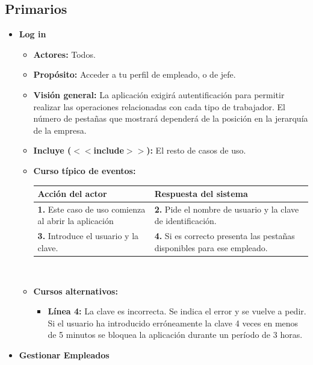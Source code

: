 \documentclass[spanish,a4paper,12pt]{report}		%
\begin{document}
\subsection{Primarios}		 		
	\begin{itemize} 	


	\item \textbf{Log in}		
			\begin{itemize}
			\item \textbf{Actores:} Todos.
			\item \textbf{Propósito:} Acceder a tu perfil de empleado, o de jefe.
			\item \textbf{Visión general:} La aplicación exigirá autentificación para permitir realizar las operaciones relacionadas con cada tipo de trabajador. El número de pestañas que mostrará dependerá de la posición en la jerarquía de la empresa. 
			\item \textbf{Incluye ($<<$include$>>$):} El resto de casos de uso.
			\item \textbf{Curso típico de eventos:} 	\\
				\begin{tabular}{|p{6cm}||p{6cm}|}
				\hline
				\textbf{Acción del actor} & \textbf{Respuesta del sistema} \\ \hline \hline
				\textbf{1.} Este caso de uso comienza al abrir la aplicación & \textbf{2.} Pide el nombre de usuario y  la clave de identificación.\\ \hline 
				\textbf{3.} Introduce el usuario y  la clave. & \textbf{4.} Si es correcto presenta las pestañas disponibles para ese empleado.\\ \hline
			\end{tabular}
			\\
			\item \textbf{Cursos alternativos:} 
			\begin{itemize}
			\item  \textbf{Línea 4:} La clave es incorrecta. Se indica el error y se vuelve a pedir. Si el usuario ha introducido erróneamente la clave 4 veces en menos de 5 minutos se bloquea la aplicación durante un período de 3 horas.
			\end {itemize}
		\end{itemize}%


	\newpage
	\item \textbf{Gestionar Empleados} \\ 
	

\end{itemize}
\end{document}
